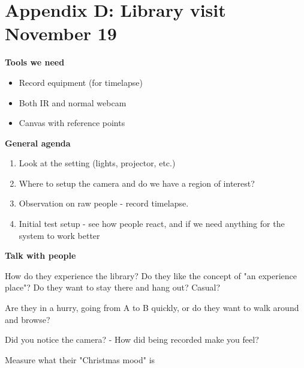 \section{Appendix D: Library visit November 19}\label{targetgroup_visit}
\textbf{Tools we need}
\begin{itemize}
\item Record equipment (for timelapse)
\item Both IR and normal webcam
\item Canvas with reference points
\end{itemize}

\textbf{General agenda}
\begin{enumerate}
\item Look at the setting (lights, projector, etc.)
\item Where to setup the camera and do we have a region of interest?
\item Observation on raw people - record timelapse.
\item Initial test setup - see how people react, and if we need anything for the system to work better
\end{enumerate}

\textbf{Talk with people}

How do they experience the library? Do they like the concept of "an experience place"? Do they want to stay there and hang out? Casual?

Are they in a hurry, going from A to B quickly, or do they want to walk around and browse?

Did you notice the camera?
- How did being recorded make you feel?

Measure what their "Christmas mood" is